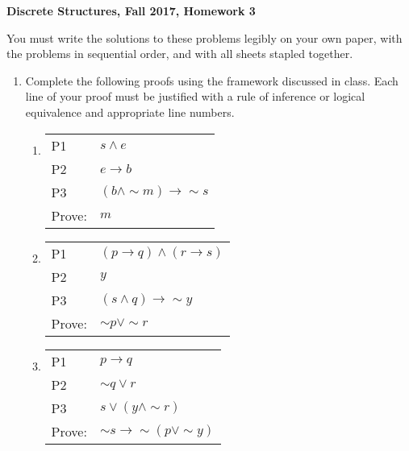 \documentclass[12pt, letterpaper]{report}
\newcommand{\nott}{{\sim}}
\begin{document}
{\textbf{Discrete Structures, Fall 2017, Homework 3}}

\medbreak

You must write the solutions to these problems legibly on your own paper, with
the problems in sequential order, and with all sheets stapled together.

\begin{enumerate}

\item Complete the following proofs using the framework discussed in class.  Each line
        of your proof must be justified with a rule of inference or logical equivalence and appropriate line numbers.

\begin{enumerate}

\item
        \begin{tabular}[t]{ll}
        P1 & $s \land e$ \\
        P2 & $e \to b$ \\
        P3 & $(b \land \nott m) \to \nott s$ \\ \hline
        Prove: & $m$
        \end{tabular}           
        
                \item
                        \begin{tabular}[t]{ll}
                        P1 & $(p \to q) \land (r \to s)$ \\
                        P2 & $y$ \\
                        P3 & $(s \land q) \to \nott y$ \\ \hline
                        Prove: & $\nott p \lor \nott r$
                \end{tabular}
                
                                
                
                \item
                        \begin{tabular}[t]{ll}
                        P1 & $p \to q$ \\
                        P2 & $\nott q \lor r$ \\
                        P3 & $s \lor (y \land \nott r)$ \\ \hline
                        Prove: & $\nott s \to \nott (p \lor \nott y)$
                \end{tabular}
                

\end{enumerate}
\end{enumerate}
\end{document}
